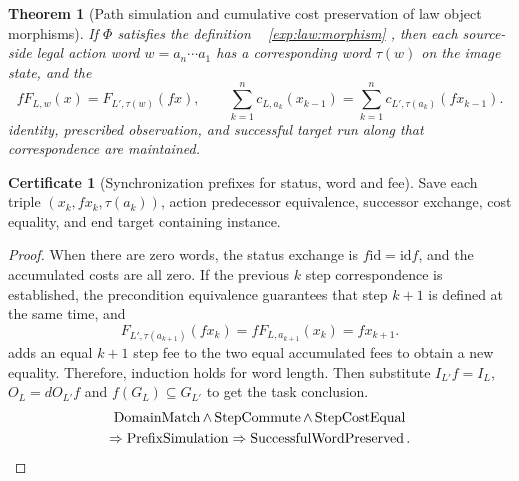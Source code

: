 \documentclass[12pt,a4paper,openany,notitlepage]{report}
\theoremstyle{plain}
\newtheorem{theorem}{Theorem}[chapter]
\theoremstyle{definition}
\newtheorem*{certificate}{Certificate}
\theoremstyle{remark}
\begin{document}
\begin{CJK*}
\begin{theorem}
[Path simulation and cumulative cost preservation of law object morphisms]\label{exp:law:simulation}
If $\Phi$ satisfies the definition ~ \ref{exp:law:morphism} , then each source-side legal action word $w=a_n\cdots a_1$ has a corresponding word $\tau(w)$ on the image state, and the \[
 fF_{L,w}(x)=F_{L',\tau(w)}(fx),\qquad
 \sum_{k=1}^n c_{L,a_k}(x_{k-1})
 =\sum_{k=1}^n c_{L',\tau(a_k)}(f x_{k-1}).
\] identity, prescribed observation, and successful target run along that correspondence are maintained.\end{theorem}
\begin{certificate}
[Synchronization prefixes for status, word and fee]Save each triple $(x_k,fx_k,\tau(a_k))$, action predecessor equivalence, successor exchange, cost equality, and end target containing instance.\end{certificate}
\begin{proof}
When there are zero words, the status exchange is $f\mathrm{id}=\mathrm{id}f$, and the accumulated costs are all zero. If the previous $k$ step correspondence is established, the precondition equivalence guarantees that step $k+1$ is defined at the same time, and \[
 F_{L',\tau(a_{k+1})}(fx_k)=fF_{L,a_{k+1}}(x_k)=fx_{k+1}.
\] adds an equal $k+1$ step fee to the two equal accumulated fees to obtain a new equality. Therefore, induction holds for word length. Then substitute $I_{L'}f=I_L$, $O_L=dO_{L'}f$ and $f(G_L)\subseteq G_{L'}$ to get the task conclusion. \begin{gather*}
 \operatorname{DomainMatch}\land\operatorname{StepCommute}\land\operatorname{StepCostEqual}\\
 \Rightarrow\operatorname{PrefixSimulation}
 \Rightarrow\operatorname{SuccessfulWordPreserved}.\qedhere
\end{gather*}\end{proof}



\end{CJK*}
\end{document}
